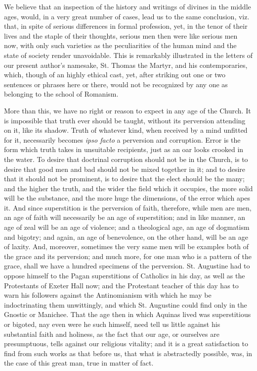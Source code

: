 We believe that an inspection of the history and
writings of divines in the middle ages, would, in a very great number of
cases, lead us to the same conclusion, viz. that, in spite of serious
differences in formal profession, yet, in the tenor of their lives and
the staple of their thoughts, serious men then were like serious men
now, with only such varieties as the peculiarities of the human mind and
the state of society render unavoidable. This is remarkably illustrated
in the letters of our present author's namesake, St. Thomas the Martyr,
and his contemporaries, which, though of an highly ethical cast, yet,
after striking out one or two sentences or phrases here or there, would
not be recognized by any one as belonging to the school of Romanism.

More than this, we have no right or reason to
expect in any age of the Church. It is impossible that truth ever should
be taught, without its perversion attending on it, like its shadow.
Truth of whatever kind, when received by a mind unfitted for it,
necessarily becomes \emph{ipso facto} a perversion and corruption. Error
is the form which truth takes in unsuitable recipients, just as an oar
looks crooked in the water. To desire that doctrinal corruption should
not be in the Church, is to desire that good men and bad should not be
mixed together in it; and to desire that it should not be prominent, is
to desire that the elect should be the many; and the higher the truth,
and the wider the field which it occupies, the more solid will be the
substance, and the more huge the dimensions, of the error which apes it.
And since superstition is the perversion of faith, therefore, while men
are men, an age of faith will necessarily be an age of superstition; and
in like manner, an age of zeal will be an age of violence; and a
theological age, an age of dogmatism and bigotry; and again, an age of
benevolence, on the other hand, will be an age of laxity. And, moreover, sometimes the very same men will be examples both of the grace
and its perversion; and much more, for one man who is a pattern of the
grace, shall we have a hundred specimens of the perversion. St.
Augustine had to oppose himself to the Pagan superstitions of Catholics
in his day, as well as the Protestants of Exeter Hall now; and the
Protestant teacher of this day has to warn his followers against the
Antinomianism with which he may be indoctrinating them unwittingly, and
which St. Augustine could find only in the Gnostic or Manichee. That the
age then in which Aquinas lived was superstitious or bigoted, nay even
were he such himself, need tell us little against his substantial faith
and holiness, as the fact that our age, or ourselves are presumptuous,
tells against our religious vitality; and it is a great satisfaction to
find from such works as that before us, that what is abstractedly
possible, was, in the case of this great man, true in matter of fact.


